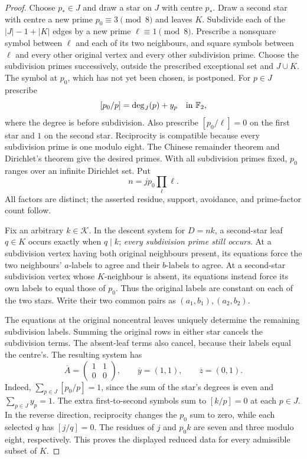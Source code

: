 \documentclass[11pt,a4paper]{article}
\theoremstyle{remark}\newtheorem{remark}[theorem]{Remark}
\begin{document}
\begin{proof}
Choose $p_*\in J$ and draw a star on $J$ with centre $p_*$.
Draw a second star with centre a new prime $p_0\equiv3\pmod8$
and leaves $K$. Subdivide each of the $|J|-1+|K|$ edges by a
new prime $\ell\equiv1\pmod8$. Prescribe a nonsquare symbol
between $\ell$ and each of its two neighbours, and square symbols
between $\ell$ and every other original vertex and every other
subdivision prime. Choose the subdivision primes successively,
outside the prescribed exceptional set and $J\cup K$.
The symbol at $p_0$, which has not yet been chosen, is postponed.
For $p\in J$ prescribe
\begin{equation}\label{eq:p0}
 [p_0/p]=\deg_J(p)+y_p\quad\text{in }\mathbb F_2,
\end{equation}
where the degree is before subdivision. Also prescribe
$[p_0/\ell]=0$ on the first star and $1$ on the second star.
Reciprocity is compatible because every subdivision prime is one
modulo eight. The Chinese remainder theorem and Dirichlet's theorem
give the desired primes. With all subdivision primes fixed, $p_0$
ranges over an infinite Dirichlet set. Put
\[
 n=j p_0\prod_{\ell}\ell.
\]
All factors are distinct; the asserted residue, support, avoidance,
and prime-factor count follow.

Fix an arbitrary $k\in\mathcal K$. In the descent system for
$D=nk$, a second-star leaf $q\in K$ occurs exactly when $q\mid k$;
\emph{every subdivision prime still occurs}. At a subdivision
vertex having both original neighbours present, its equations force
the two neighbours' $a$-labels to agree and their $b$-labels to agree.
At a second-star subdivision vertex whose $K$-neighbour is absent,
its equations instead force its own labels to equal those of $p_0$.
Thus the original labels are constant on each of the two stars.
Write their two common pairs as $(a_1,b_1),(a_2,b_2)$.

The equations at the original noncentral leaves uniquely determine
the remaining subdivision labels. Summing the original rows in
either star cancels the subdivision terms. The absent-leaf terms
also cancel, because their labels equal the centre's. The resulting
system has
\[
 \overline A=\begin{pmatrix}1&1\\0&0\end{pmatrix},\qquad
 \overline y=(1,1),\qquad\overline z=(0,1).
\]
Indeed, $\sum_{p\in J}[p_0/p]=1$, since the sum of the star's
degrees is even and $\sum_{p\in J}y_p=1$.
The extra first-to-second symbols sum to $[k/p]=0$ at each
$p\in J$. In the reverse direction, reciprocity changes the
$p_0$ sum to zero, while each selected $q$ has $[j/q]=0$.
The residues of $j$ and $p_0k$ are seven and three modulo eight,
respectively. This proves the displayed reduced data for every
admissible subset of $K$.


\end{proof}
\end{document}
